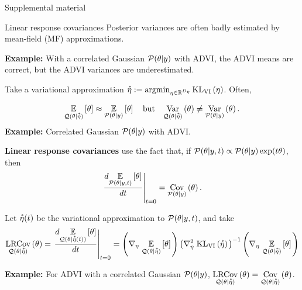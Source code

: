\documentclass[8pt]{beamer}\usepackage[]{graphicx}\usepackage[]{color}
\begin{document}
\begin{frame}
    \huge{Supplemental material}
\end{frame}




\begin{frame}{Linear response covariances}
%
Posterior variances are often badly estimated by mean-field (MF) approximations.

\textbf{Example: } With a correlated Gaussian $\mathcal{P}(\theta \vert y)$ with ADVI,
the ADVI means are correct, but the ADVI variances are underestimated.

Take a variational approximation 
$\accentset{*}{\eta} := \operatorname*{\mathrm{argmin}}_{\eta \in \mathbb{R}^{D_{\eta}}} \mathrm{KL}_{\mathrm{VI}}\left(\eta\right)$.  Often,

\begin{align}\label{eq:mfvb_conceit}
    \underset{\mathcal{Q}(\theta \vert \accentset{*}{\eta})}{\mathbb{E}}\left[\theta\right] \approx
    \underset{\mathcal{P}(\theta \vert y)}{\mathbb{E}}\left[\theta\right] \quad\textrm{but}\quad
    \underset{\mathcal{Q}(\theta \vert \accentset{*}{\eta})}{\mathrm{Var}}\left(\theta\right) \ne
    \underset{\mathcal{P}(\theta \vert y)}{\mathrm{Var}}\left(\theta\right).
\end{align}    
%
\textbf{Example: }Correlated Gaussian $\mathcal{P}(\theta \vert y)$ with ADVI.

\textbf{Linear response covariances} use the fact that, if
$\mathcal{P}(\theta \vert y, t) \propto \mathcal{P}(\theta \vert y) \exp(t \theta)$, then
%
\begin{align}\label{eq:deriv_is_cov}
    \left. \frac{d \underset{\mathcal{P}(\theta \vert y, t)}{\mathbb{E}}\left[\theta\right]}{dt} \right|_{t=0} = \underset{\mathcal{P}(\theta \vert y)}{\mathrm{Cov}}\left(\theta\right).
\end{align}

Let $\accentset{*}{\eta}(t)$ be the variational approximation to $\mathcal{P}(\theta \vert y, t)$, and
take
%
\begin{align*}
    \underset{\mathcal{Q}(\theta \vert \accentset{*}{\eta})}{\mathrm{LRCov}}\left(\theta\right)
    =
    \left. \frac{d \underset{\mathcal{Q}(\theta \vert \accentset{*}{\eta}(t))}{\mathbb{E}}\left[\theta\right]}{dt} \right|_{t=0}
    =
    \left( \nabla_{\eta} \left. \underset{\mathcal{Q}(\theta \vert \accentset{*}{\eta})}{\mathbb{E}}\left[\theta\right] \right.\right)
    \left(\nabla^2_{\eta} \left. \mathrm{KL}_{\mathrm{VI}}\left(\accentset{*}{\eta}\right) \right. \right)^{-1}
    \left( \nabla_{\eta} \left. \underset{\mathcal{Q}(\theta \vert \accentset{*}{\eta})}{\mathbb{E}}\left[\theta\right] \right.\right)
\end{align*}
%

\textbf{Example: } For ADVI with a correlated Gaussian $\mathcal{P}(\theta \vert y)$,
$\underset{\mathcal{Q}(\theta \vert \accentset{*}{\eta})}{\mathrm{LRCov}}\left(\theta\right)  = \underset{\mathcal{Q}(\theta \vert \accentset{*}{\eta})}{\mathrm{Cov}}\left(\theta\right)$.


\end{frame}
\end{document}
